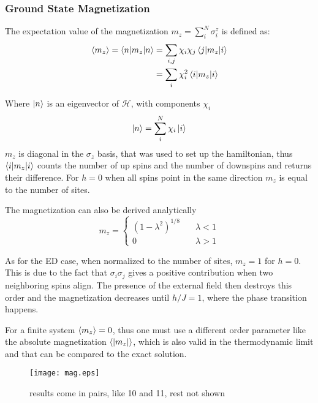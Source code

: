 \documentclass{article}
\begin{document}
\subsubsection{Ground State Magnetization}
The expectation value of the magnetization $m_z = \sum_i^N \sigma_i^z$
is defined as:
\begin{align}
\label{eq:32}
\braket{m_z} = \braket{n|m_z|n} &= \sum\limits_{i,j} \chi_i \chi_j 
                                  \braket{j|m_z|i}\\
&= \sum\limits_i \chi_i^2 \braket{i|m_z|i}
\end{align}

Where $\ket{n}$ is an eigenvector of $\mathcal{H}$, with components $\chi_i$
\begin{equation*}
\label{eq:33}
\ket{n} = \sum\limits_i^N \chi_i \ket{i}
\end{equation*}
$m_z$ is diagonal in the $\sigma_z$ basis, that was used to set up the
hamiltonian, thus $\braket{i|m_z|i}$ counts the number of up spins and the number of
 downspins and returns their difference. For $h = 0$ when all spins
 point in the same direction $m_z$ is equal to the number of sites.

The magnetization can also be derived analytically \cite{Pfeuty} 
\begin{equation}
\label{eq:13}
m_z = 
\begin{cases} (1-\lambda^2)^{1/8} & \quad \lambda <1\\
0 & \quad \lambda >1
\end{cases}
\end{equation}

As for the ED case, when normalized to the number of sites, $m_z = 1$
for $h = 0$. This is due to the fact that $\sigma_i\sigma_j$ gives a
positive contribution when two neighboring spins align. The presence
of the external field then destroys this order and the magnetization
decreases until $h/J = 1$, where the phase transition happens.

For a finite system $\braket{m_z} = 0$, thus one must use a different
order parameter like the  absolute
magnetization $\braket{|m_z|}$, which is also valid in the
thermodynamic limit and that can be compared to the exact solution.

\begin{figure}[htbp]
\centerline{\texttt{[image: mag.eps]}}
\caption[]{\label{fig:mag} results come in pairs, like 10 and 11, rest
not shown}
\end{figure}
\end{document}
